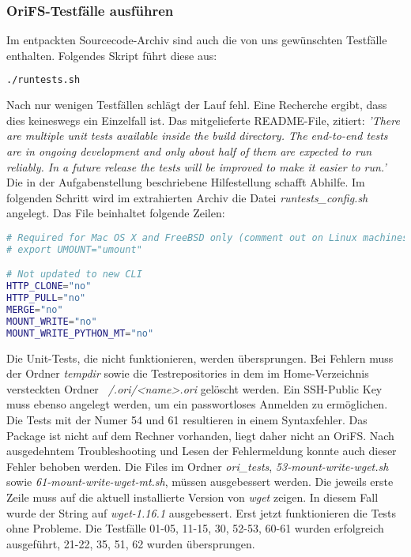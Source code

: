 \subsubsection{OriFS-Testfälle ausführen}
\label{subsubsec:OriFS-Testfälle ausführen}
Im entpackten Sourcecode-Archiv sind auch die von uns gewünschten Testfälle enthalten. Folgendes Skript führt diese aus:
\begin{lstlisting}[frame=single, language=bash, caption=Erster Versuch Testfälle]
./runtests.sh
\end{lstlisting}
Nach nur wenigen Testfällen schlägt der Lauf fehl. Eine Recherche ergibt, dass dies keineswegs ein Einzelfall ist. Das mitgelieferte README-File, zitiert: \newline
\textit{'There are multiple unit tests available inside the build directory.  The
end-to-end tests are in ongoing development and only about half of them are
expected to run reliably.  In a future release the tests will be improved to
make it easier to run.'} \newline
Die in der Aufgabenstellung beschriebene Hilfestellung schafft Abhilfe. \cite{OrifsBitbucket} Im folgenden Schritt wird im extrahierten Archiv die Datei \textit{runtests\_config.sh} angelegt. Das File beinhaltet folgende Zeilen:
\begin{lstlisting}[frame=single, language=bash, caption=Inhalt runtests\_config.sh]
# Required for Mac OS X and FreeBSD only (comment out on Linux machines)
# export UMOUNT="umount"

# Not updated to new CLI
HTTP_CLONE="no"
HTTP_PULL="no"
MERGE="no"
MOUNT_WRITE="no"
MOUNT_WRITE_PYTHON_MT="no"
\end{lstlisting}
\clearpage
Die Unit-Tests, die nicht funktionieren, werden übersprungen. Bei Fehlern muss der Ordner \textit{tempdir} sowie die Testrepositories in dem im Home-Verzeichnis versteckten Ordner \textit{~/.ori/<name>.ori} gelöscht werden. Ein SSH-Public Key muss ebenso angelegt werden, um ein passwortloses Anmelden zu ermöglichen. Die Tests mit der Numer 54 und 61 resultieren in einem Syntaxfehler. Das Package ist nicht auf dem Rechner vorhanden, liegt daher nicht an OriFS. Nach ausgedehntem Troubleshooting und Lesen der Fehlermeldung konnte auch dieser Fehler behoben werden. Die Files im Ordner \textit{ori\_tests}, \textit{53-mount-write-wget.sh} sowie \textit{61-mount-write-wget-mt.sh}, müssen ausgebessert werden. Die jeweils erste Zeile muss auf die aktuell installierte Version von \textit{wget} zeigen. In diesem Fall wurde der String auf \textit{wget-1.16.1} ausgebessert. Erst jetzt funktionieren die Tests ohne Probleme. Die Testfälle 01-05, 11-15, 30, 52-53, 60-61 wurden erfolgreich ausgeführt, 21-22, 35, 51, 62 wurden übersprungen.

